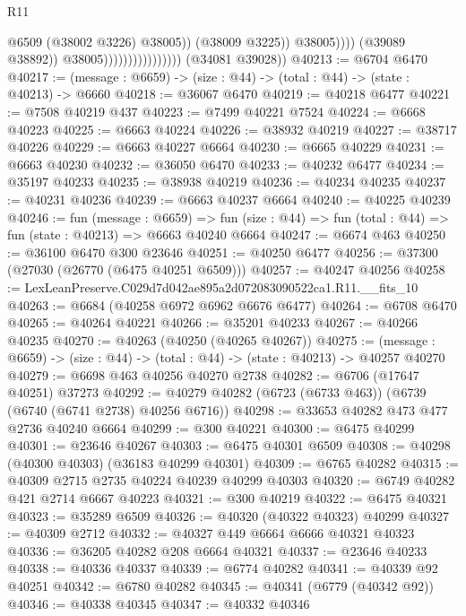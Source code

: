 \begin{lexlean}{R11}
\begin{coremodule}
                                                      @6509
                                                      (@38002 @3226)
                                                      @38005))
                                                  (@38009 @3225))
                                                @38005))))
                                        (@39089 @38892))
                                      @38005))))))))))))))))
      (@34081 @39028))
@40213 := @6704 @6470
@40217 := (message : @6659) -> (size : @44) -> (total : @44) -> (state : @40213) -> @6660
@40218 := @36067 @6470
@40219 := @40218 @6477
@40221 := @7508 @40219 @437
@40223 := @7499 @40221 @7524
@40224 := @6668 @40223
@40225 := @6663 @40224
@40226 := @38932 @40219
@40227 := @38717 @40226
@40229 := @6663 @40227 @6664
@40230 := @6665 @40229
@40231 := @6663 @40230
@40232 := @36050 @6470
@40233 := @40232 @6477
@40234 := @35197 @40233
@40235 := @38938 @40219
@40236 := @40234 @40235
@40237 := @40231 @40236
@40239 := @6663 @40237 @6664
@40240 := @40225 @40239
@40246 := fun (message : @6659) =>
  fun (size : @44) => fun (total : @44) => fun (state : @40213) => @6663 @40240 @6664
@40247 := @6674 @463
@40250 := @36100 @6470 @300 @23646
@40251 := @40250 @6477
@40256 := @37300 (@27030 (@26770 (@6475 @40251 @6509)))
@40257 := @40247 @40256
@40258 := LexLeanPreserve.C029d7d042ae895a2d072083090522ca1.R11.__fits_10
@40263 := @6684 (@40258 @6972 @6962 @6676 @6477)
@40264 := @6708 @6470
@40265 := @40264 @40221
@40266 := @35201 @40233
@40267 := @40266 @40235
@40270 := @40263 (@40250 (@40265 @40267))
@40275 := (message : @6659) -> (size : @44) -> (total : @44) -> (state : @40213) -> @40257 @40270
@40279 := @6698 @463 @40256 @40270 @2738
@40282 := @6706 (@17647 @40251) @37273
@40292 := @40279 @40282 (@6723 (@6733 @463)) (@6739 (@6740 (@6741 @2738) @40256 @6716))
@40298 := @33653 @40282 @473 @477 @2736 @40240 @6664
@40299 := @300 @40221
@40300 := @6475 @40299
@40301 := @23646 @40267
@40303 := @6475 @40301 @6509
@40308 := @40298 (@40300 @40303) (@36183 @40299 @40301)
@40309 := @6765 @40282
@40315 := @40309 @2715 @2735 @40224 @40239 @40299 @40303
@40320 := @6749 @40282 @421 @2714 @6667 @40223
@40321 := @300 @40219
@40322 := @6475 @40321
@40323 := @35289 @6509
@40326 := @40320 (@40322 @40323) @40299
@40327 := @40309 @2712
@40332 := @40327 @449 @6664 @6666 @40321 @40323
@40336 := @36205 @40282 @208 @6664 @40321
@40337 := @23646 @40233
@40338 := @40336 @40337
@40339 := @6774 @40282
@40341 := @40339 @92 @40251
@40342 := @6780 @40282
@40345 := @40341 (@6779 (@40342 @92))
@40346 := @40338 @40345
@40347 := @40332 @40346

\end{coremodule}
\end{lexlean}
